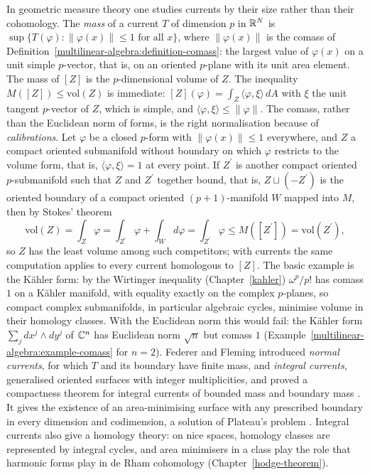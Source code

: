 \begin{remark}\label{de-rham:remark-gmt-currents}
In geometric measure theory one studies currents by their size rather than their cohomology. The \emph{mass} of a current $T$ of dimension $p$ in $\mathbb{R}^N$ is
$\sup\{T(\varphi) : \|\varphi(x)\| \leq 1 \text{ for all } x\}$, where $\|\varphi(x)\|$ is the comass of Definition~\ref{multilinear-algebra:definition-comass}: the largest value of $\varphi(x)$ on a unit simple $p$-vector, that
is, on an oriented $p$-plane with its unit area element. The mass of $[Z]$ is the $p$-dimensional volume of $Z$. The inequality $M([Z]) \leq \mathrm{vol}(Z)$ is immediate: $[Z](\varphi) = \int_Z\langle\varphi, \xi\rangle\,dA$ with
$\xi$ the unit tangent $p$-vector of $Z$, which is simple, and $\langle\varphi, \xi\rangle \leq \|\varphi\|$. The comass, rather than the Euclidean norm of forms, is the right normalisation because of
\emph{calibrations}. Let $\varphi$ be a closed $p$-form with $\|\varphi(x)\| \leq 1$ everywhere, and $Z$ a compact oriented submanifold without boundary on which $\varphi$ restricts to the volume form, that is,
$\langle\varphi, \xi\rangle = 1$ at every point. If $Z^{\prime}$ is another compact oriented $p$-submanifold such that $Z$ and $Z^{\prime}$ together bound, that is, $Z \sqcup (-Z^{\prime})$ is the oriented boundary of a compact oriented
$(p + 1)$-manifold $W$ mapped into $M$, then by Stokes' theorem
\[
\mathrm{vol}(Z) = \int_Z\varphi = \int_{Z^{\prime}}\varphi + \int_Wd\varphi = \int_{Z^{\prime}}\varphi \leq M([Z^{\prime}]) = \mathrm{vol}(Z^{\prime}),
\]
so $Z$ has the least volume among such competitors; with currents the same computation applies to every current homologous to $[Z]$. The basic example is the K\"ahler form: by the Wirtinger inequality (Chapter~\ref{kahler}) $\omega^p/p!$ has comass $1$ on a K\"ahler manifold, with
equality exactly on the complex $p$-planes, so compact complex submanifolds, in particular algebraic cycles, minimise volume in their homology classes. With the Euclidean norm this would fail: the K\"ahler form
$\sum_jdx^j \wedge dy^j$ of $\mathbb{C}^n$ has Euclidean norm $\sqrt n$ but comass $1$ (Example~\ref{multilinear-algebra:example-comass} for $n = 2$). Federer and Fleming introduced \emph{normal currents}, for which $T$ and its
boundary have finite mass, and \emph{integral currents}, generalised oriented surfaces with integer multiplicities, and proved a compactness theorem for integral currents of bounded mass and
boundary mass \cite{federer-fleming-1960}. It gives the existence of an area-minimising surface with any prescribed boundary in every dimension and codimension, a solution of Plateau's problem
\cite{federer-gmt}. Integral currents also give a homology theory: on nice spaces, homology classes are represented by integral cycles, and area minimisers in a class play the role that harmonic
forms play in de Rham cohomology (Chapter~\ref{hodge-theorem}).
\end{remark}

